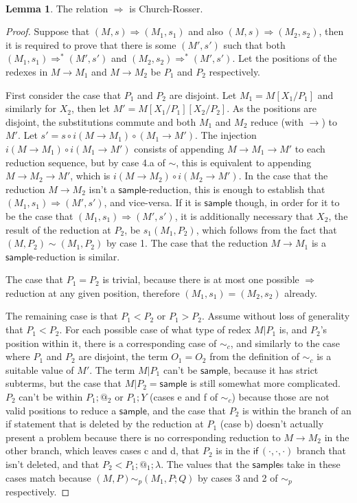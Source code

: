 \documentclass{article}
\newcommand{\tif}[3]{\textsf{if}\,(#1, #2, #3)} %
\newcommand{\tsample}{\textsf{sample}}
\theoremstyle{definition}
\theoremstyle{lemma}
\newtheorem{lemma}{Lemma}
\theoremstyle{remark}
\begin{document}
\paragraph{}
\begin{lemma}
The relation $\Rightarrow$ is Church-Rosser.
\end{lemma}
\begin{proof}
Suppose that $(M,s) \Rightarrow (M_1,s_1)$ and also $(M,s) \Rightarrow (M_2,s_2)$, then it is required to prove that there is some $(M',s')$ such that both $(M_1,s_1) \Rightarrow^* (M',s')$ and $(M_2,s_2) \Rightarrow^* (M',s')$. Let the positions of the redexes in $M \to M_1$ and $M \to M_2$ be $P_1$ and $P_2$ respectively.

First consider the case that $P_1$ and $P_2$ are disjoint. Let $M_1 = M[X_1/P_1]$ and similarly for $X_2$, then let $M' = M[X_1/P_1][X_2/P_2]$. As the positions are disjoint, the substitutions commute and both $M_1$ and $M_2$ reduce (with $\to$) to $M'$. Let $s' = s \circ i(M \to M_1) \circ(M_1 \to M')$. The injection $i(M \to M_1) \circ i(M_1 \to M')$ consists of appending $M \to M_1 \to M'$ to each reduction sequence, but by case 4.a of $\sim$, this is equivalent to appending $M \to M_2 \to M'$, which is $i(M \to M_2) \circ i(M_2 \to M')$. In the case that the reduction $M \to M_2$ isn't a $\tsample$-reduction, this is enough to establish that $(M_1, s_1) \Rightarrow (M', s')$, and vice-versa. If it is $\tsample$ though, in order for it to be the case that $(M_1, s_1) \Rightarrow (M', s')$, it is additionally necessary that $X_2$, the result of the reduction at $P_2$, be $s_1(M_1, P_2)$, which follows from the fact that $(M, P_2) \sim (M_1, P_2)$ by case 1. The case that the reduction $M \to M_1$ is a $\tsample$-reduction is similar.

The case that $P_1 = P_2$ is trivial, because there is at most one possible $\Rightarrow$ reduction at any given position, therefore $(M_1, s_1) = (M_2, s_2)$ already.

The remaining case is that $P_1 < P_2$ or $P_1 > P_2$. Assume without loss of generality that $P_1 < P_2$. For each possible case of what type of redex $M | P_1$ is, and $P_2$'s position within it, there is a corresponding case of $\sim_c$, and similarly to the case where $P_1$ and $P_2$ are disjoint, the term $O_1 = O_2$ from the definition of $\sim_c$ is a suitable value of $M'$. The term $M | P_1$ can't be $\tsample$, because it has strict subterms, but the case that $M | P_2 = \tsample$ is still somewhat more complicated. $P_2$ can't be within $P_1 ; @_2$ or $P_1 ; Y$ (cases e and f of $\sim_c$) because those are not valid positions to reduce a $\tsample$, and the case that $P_2$ is within the branch of an if statement that is deleted by the reduction at $P_1$ (case b) doesn't actually present a problem because there is no corresponding reduction to $M \to M_2$ in the other branch, which leaves cases c and d, that $P_2$ is in the $\tif{\cdot}{\cdot}{\cdot}$ branch that isn't deleted, and that $P_2 < P_1 ; @_1 ; \lambda$.  The values that the $\tsample$s take in these cases match because $(M,P) \sim_p (M_1, P;Q)$ by cases 3 and 2 of $\sim_p$ respectively.
\end{proof}
\end{document}
